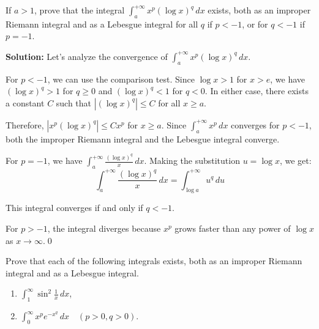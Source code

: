 \begin{problembox}
If $a > 1$, prove that the integral $\int_{a}^{+\infty} x^p (\log x)^q \, dx$ exists, both as an improper Riemann integral and as a Lebesgue integral for all $q$ if $p < -1$, or for $q < -1$ if $p = -1$.
\end{problembox}

\bigskip\noindent\textbf{Solution:}
Let's analyze the convergence of $\int_{a}^{+\infty} x^p (\log x)^q \, dx$.

For $p < -1$, we can use the comparison test. Since $\log x > 1$ for $x > e$, we have $(\log x)^q > 1$ for $q \geq 0$ and $(\log x)^q < 1$ for $q < 0$. In either case, there exists a constant $C$ such that $|(\log x)^q| \leq C$ for all $x \geq a$.

Therefore, $|x^p (\log x)^q| \leq C x^p$ for $x \geq a$. Since $\int_{a}^{+\infty} x^p \, dx$ converges for $p < -1$, both the improper Riemann integral and the Lebesgue integral converge.

For $p = -1$, we have $\int_{a}^{+\infty} \frac{(\log x)^q}{x} \, dx$. Making the substitution $u = \log x$, we get:
\[\int_{a}^{+\infty} \frac{(\log x)^q}{x} \, dx = \int_{\log a}^{+\infty} u^q \, du\]

This integral converges if and only if $q < -1$.

For $p > -1$, the integral diverges because $x^p$ grows faster than any power of $\log x$ as $x \to \infty$.\qed


\begin{problembox}
Prove that each of the following integrals exists, both as an improper Riemann integral and as a Lebesgue integral.
\begin{enumerate}[label=(\alph*)]
    \item $\int_{1}^{\infty} \sin^2 \frac{1}{x} \, dx$,
    \item $\int_{0}^{\infty} x^pe^{-x^q} \, dx \quad (p > 0, q > 0)$.
\end{enumerate}
\end{problembox}

